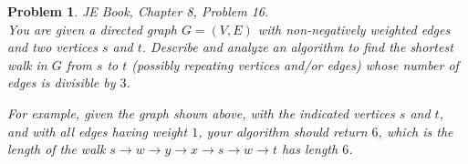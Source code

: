 \documentclass[12pt]{article}
\newtheorem{problem}{Problem}
\begin{document}
\begin{problem}
 JE Book, Chapter 8, Problem 16. \\
 \indent You are given a directed graph $G = (V, E)$ with non-negatively weighted edges and two vertices $s$ and $t$. Describe and analyze an algorithm to find the shortest walk in $G$ from $s$ to $t$ (possibly repeating vertices and/or edges) whose number of edges is divisible by $3$.

\begin{center}
\end{center}


\indent For example, given the graph shown above, with the indicated vertices $s$
and $t$, and with all edges having weight $1$, your algorithm should return $6$,
which is the length of the walk $s \rightarrow w \rightarrow y \rightarrow x \rightarrow s \rightarrow w \rightarrow t$ has length $6$.
\end{problem}

\end{document}
